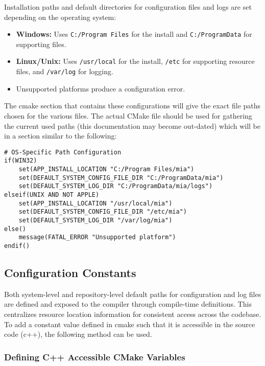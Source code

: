 Installation paths and default directories for configuration files and logs are set depending on the operating system:
\begin{itemize}\itemsep0em
	\item \textbf{Windows:} Uses \texttt{C:/Program Files} for the install and \texttt{C:/ProgramData} for supporting files.
	\item \textbf{Linux/Unix:} Uses \texttt{/usr/local} for the install, \texttt{/etc} for supporting resource files, and \texttt{/var/log} for logging.
	\item Unsupported platforms produce a configuration error.
\end{itemize}
The cmake section that contains these configurations will give the exact file paths chosen for the various files. The actual CMake file should be used for gathering the current used paths (this documentation may become out-dated) which will be in a section similar to the following:
\begin{lstlisting}[style=shellstyle]
# OS-Specific Path Configuration
if(WIN32)
    set(APP_INSTALL_LOCATION "C:/Program Files/mia")
    set(DEFAULT_SYSTEM_CONFIG_FILE_DIR "C:/ProgramData/mia")
    set(DEFAULT_SYSTEM_LOG_DIR "C:/ProgramData/mia/logs")
elseif(UNIX AND NOT APPLE)
    set(APP_INSTALL_LOCATION "/usr/local/mia")
    set(DEFAULT_SYSTEM_CONFIG_FILE_DIR "/etc/mia")
    set(DEFAULT_SYSTEM_LOG_DIR "/var/log/mia")
else()
    message(FATAL_ERROR "Unsupported platform")
endif()
\end{lstlisting}

\subsection{Configuration Constants}

Both system-level and repository-level default paths for configuration and log files are defined and exposed to the compiler through compile-time definitions. This centralizes resource location information for consistent access across the codebase. To add a constant value defined in cmake such that it is accessible in the source code (c++), the following method can be used.

\subsubsection{Defining C++ Accessible CMake Variables}
\label{sec:CMake-setup-cpp}

